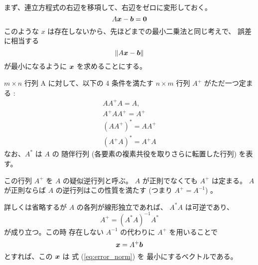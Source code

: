 \documentclass[12pt]{jsarticle}
\begin{document}
まず、連立方程式の右辺を移項して、右辺をゼロに変形しておく。
\begin{equation}
  A \bm{x} - \bm{b} = \bm{0}
\end{equation}
このような $x$ は存在しないから、先ほどまでの最小二乗法と同じ考えで、
誤差に相当する
\begin{equation}
  \| A \bm{x} - \bm{b} \| \label{eq:error_norm}
\end{equation}
が最小になるように $\bm{x}$ を求めることにする。

$m \times n$ 行列 A に対して、以下の 4 条件を満たす $n \times m$ 行列
$A^{+}$ がただ一つ定まる :
\begin{eqnarray}
  A A^{+} A = A, \\
  A^{+} A A^{+} = A^{+} \\
  (A A^{+})^{*} = A A^{+} \\
  (A^{+} A)^{*} = A^{+} A
\end{eqnarray}
なお、$A^{*}$ は $A$ の
随伴行列 (各要素の複素共役を取りさらに転置した行列) を表す。

この行列 $A^{+}$ を $A$ の疑似逆行列と呼ぶ。
$A$ が正則でなくても $A^{+}$ は定まる。
$A$ が正則ならば $A$ の逆行列はこの性質を満たす (つまり $A^{+} = A^{-1}$) 。

詳しくは省略するが $A$ の各列が線形独立であれば、
$A^{*} A$ は可逆であり、
\begin{equation}
  A^{+} = \left( A^{*} A \right)^{-1} A^{*}
\end{equation}
が成り立つ。この時 存在しない $A^{-1}$ の代わりに $A^{+}$ を用いることで
\begin{equation}
  \bm{x} = A^{+} \bm{b}
\end{equation}
とすれば、この $\bm{x}$ は 式 (\ref{eq:error_norm}) を
最小にするベクトルである。
\end{document}
